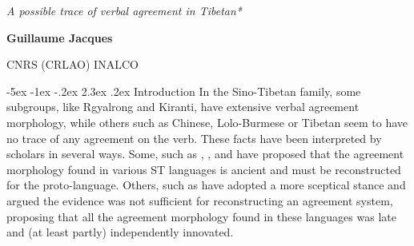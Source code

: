 \documentclass[oldfontcommands,twoside,a4paper,12pt]{memoir}
\makeatletter
\newcommand{\titre}{}
\renewcommand\section{\@startsection{section}{0}{\z@}%
                                   {-5ex \@plus -1ex \@minus -.2ex}%
                                   {2.3ex \@plus.2ex}%
                                   {\flushleft\large\bfseries}}
\makeatother
\begin{document}
\setcounter{page}{41}
\renewcommand{\titre}{\textit{Himalayan Linguistics, Vol. 9(1).} \copyright{}  
Himalayan Linguistics 2010\newline ISSN 1544-7502}
\begin{flushleft}
\renewcommand{\thefootnote}{\fnsymbol{footnote}}
{\HUGE\textit{A possible trace of verbal agreement in Tibetan*}}

\vspace{24pt}
{\large\textbf{Guillaume Jacques}}

{\large CNRS (CRLAO)} 
\newline
{\large INALCO}
\vspace{14pt}
\end{flushleft}

\renewcommand{\thefootnote}{\fnsymbol{footnote}}
\renewcommand{\thefootnote}{\arabic{footnote}}\setcounter{footnote}{0}

\section{Introduction}
In the Sino-Tibetan family, some subgroups, like Rgyalrong and Kiranti, have extensive verbal agreement morphology, while others such as Chinese, Lolo-Burmese or Tibetan seem to have no trace of any agreement on the verb. These facts have been interpreted by scholars in several ways. Some, such as \citet{bauman75}, \citet{delancey89agreement}, and \citet{driem93agreement} have proposed that the agreement morphology found in various ST languages is ancient and must be reconstructed for the proto-language. Others, such as \citet{lapolla92} have adopted a more sceptical stance and argued the evidence was not sufficient for reconstructing an agreement system, proposing that all the agreement morphology found in these languages was late and (at least partly) independently innovated.
\end{document}
